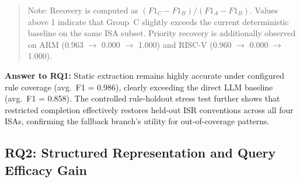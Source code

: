 \documentclass[conference]{IEEEtran}
\begin{document}
\begin{table}[t]
  \centering
  \caption{RQ1 supplementary controlled rule-holdout stress test on ISR identification. FRB: full rule base; B: held-out static only; HORC: held-out + restricted completion.}
  \label{tab:rq1_holdout}
  \begin{quote}
    \footnotesize
    Note: Recovery is computed as $(F1_C - F1_B) / (F1_A - F1_B)$. Values above 1 indicate that Group~C slightly exceeds the current deterministic baseline on the same ISA subset. Priority recovery is additionally observed on ARM (0.963 $\rightarrow$ 0.000 $\rightarrow$ 1.000) and RISC-V (0.960 $\rightarrow$ 0.000 $\rightarrow$ 1.000).
  \end{quote}
\end{table}

\begin{rqbox}
\textbf{Answer to RQ1:}
Static extraction remains highly accurate under configured rule coverage (avg.\ F1 = 0.986), clearly exceeding the direct LLM baseline (avg.\ F1 = 0.858). The controlled rule-holdout stress test further shows that restricted completion effectively restores held-out ISR conventions across all four ISAs, confirming the fallback branch's utility for out-of-coverage patterns.
\end{rqbox}


\subsection{RQ2: Structured Representation and Query Efficacy Gain}
\end{document}
